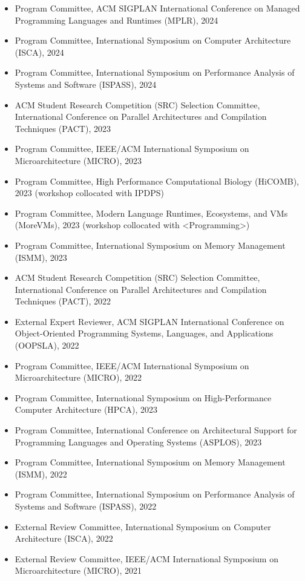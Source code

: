 \documentclass[singlecolumn,singlespace,11pt,a4paper]{article}
\begin{document}
\begin{itemize}
\item Program Committee, ACM SIGPLAN International Conference on Managed Programming Languages and Runtimes (MPLR), 2024
\item Program Committee, International Symposium on Computer Architecture (ISCA), 2024
\item Program Committee, International Symposium on Performance Analysis of Systems and Software (ISPASS), 2024
\item ACM Student Research Competition (SRC) Selection Committee, International Conference on Parallel Architectures and Compilation Techniques (PACT), 2023
\item Program Committee, IEEE/ACM International Symposium on Microarchitecture (MICRO), 2023
\item Program Committee, High Performance Computational Biology (HiCOMB), 2023 (workshop collocated with IPDPS)
\item Program Committee, Modern Language Runtimes, Ecosystems, and VMs (MoreVMs), 2023 (workshop collocated with <Programming>) 
\item Program Committee, International Symposium on Memory Management (ISMM), 2023
\item ACM Student Research Competition (SRC) Selection Committee, International Conference on Parallel Architectures and Compilation Techniques (PACT), 2022
\item External Expert Reviewer, ACM SIGPLAN International Conference on Object-Oriented Programming Systems, Languages, and Applications (OOPSLA), 2022
\item Program Committee, IEEE/ACM International Symposium on Microarchitecture (MICRO), 2022
\item Program Committee, International Symposium on High-Performance Computer Architecture (HPCA), 2023
\item Program Committee, International Conference on Architectural Support for Programming Languages and Operating Systems (ASPLOS), 2023
\item Program Committee, International Symposium on Memory Management (ISMM), 2022
\item Program Committee, International Symposium on Performance Analysis of Systems and Software (ISPASS), 2022
\item External Review Committee, International Symposium on Computer Architecture (ISCA), 2022
\item External Review Committee, IEEE/ACM International Symposium on Microarchitecture (MICRO), 2021

\end{itemize}
\end{document}
